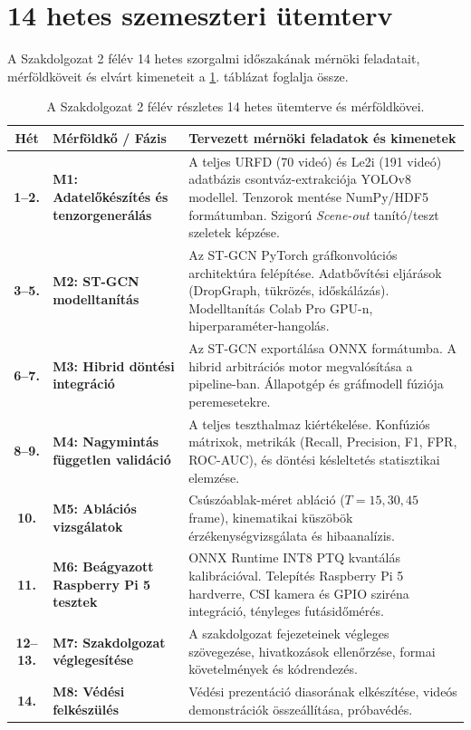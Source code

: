 \documentclass[12pt,a4paper,oneside]{report}
\begin{document}
\section{14 hetes szemeszteri ütemterv}
A Szakdolgozat 2 félév 14 hetes szorgalmi időszakának mérnöki feladatait, mérföldköveit és elvárt kimeneteit a \ref{tab:schedule}. táblázat foglalja össze.

\begin{table}[H]
\centering
\small
\begin{tabularx}{\textwidth}{cp{4.2cm}X}
\toprule
\textbf{Hét} & \textbf{Mérföldkő / Fázis} & \textbf{Tervezett mérnöki feladatok és kimenetek} \\
\midrule
\textbf{1--2.} & \textbf{M1: Adatelőkészítés és tenzorgenerálás} & A teljes URFD (70 videó) és Le2i (191 videó) adatbázis csontváz-extrakciója YOLOv8 modellel. Tenzorok mentése NumPy/HDF5 formátumban. Szigorú \textit{Scene-out} tanító/teszt szeletek képzése. \\
\textbf{3--5.} & \textbf{M2: ST-GCN modelltanítás} & Az ST-GCN PyTorch gráfkonvolúciós architektúra felépítése. Adatbővítési eljárások (DropGraph, tükrözés, időskálázás). Modelltanítás Colab Pro GPU-n, hiperparaméter-hangolás. \\
\textbf{6--7.} & \textbf{M3: Hibrid döntési integráció} & Az ST-GCN exportálása ONNX formátumba. A hibrid arbitrációs motor megvalósítása a pipeline-ban. Állapotgép és gráfmodell fúziója peremesetekre. \\
\textbf{8--9.} & \textbf{M4: Nagymintás független validáció} & A teljes teszthalmaz kiértékelése. Konfúziós mátrixok, metrikák (Recall, Precision, F1, FPR, ROC-AUC), és döntési késleltetés statisztikai elemzése. \\
\textbf{10.} & \textbf{M5: Ablációs vizsgálatok} & Csúszóablak-méret abláció ($T = 15, 30, 45$ frame), kinematikai küszöbök érzékenységvizsgálata és hibaanalízis. \\
\textbf{11.} & \textbf{M6: Beágyazott Raspberry Pi 5 tesztek} & ONNX Runtime INT8 PTQ kvantálás kalibrációval. Telepítés Raspberry Pi 5 hardverre, CSI kamera és GPIO sziréna integráció, tényleges futásidőmérés. \\
\textbf{12--13.} & \textbf{M7: Szakdolgozat véglegesítése} & A szakdolgozat fejezeteinek végleges szövegezése, hivatkozások ellenőrzése, formai követelmények és kódrendezés. \\
\textbf{14.} & \textbf{M8: Védési felkészülés} & Védési prezentáció diasorának elkészítése, videós demonstrációk összeállítása, próbavédés. \\
\bottomrule
\end{tabularx}
\caption{A Szakdolgozat 2 félév részletes 14 hetes ütemterve és mérföldkövei.}
\label{tab:schedule}
\end{table}
\end{document}
